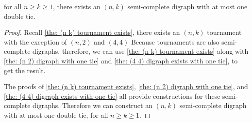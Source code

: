   \begin{theorem}
    for all \(n \geq k \geq 1\),
    there exists an \((n, k)\) semi-complete digraph with
    at most one double tie.
  \end{theorem}

  \begin{proof}
    Recall \cref{the: (n k) tournament exists},
    there exists an \((n, k)\) tournament
    with the exception of \((n, 2)\) and \((4, 4)\)
    Because tournaments are also semi-complete digraphs,
    therefore, we can use \cref{the: (n k) tournament exists}
    along with \cref{the: (n 2) digraph with one tie}
    and \cref{the: (4 4) digraph exists with one tie},
    to get the result.

    The proofs of \cref{the: (n k) tournament exists},
    \cref{the: (n 2) digraph with one tie},
    and \cref{the: (4 4) digraph exists with one tie}
    all provide constructions for these semi-complete digraphs.
    Therefore we can construct an \((n, k)\)
    semi-complete digraph with at most one double tie,
    for all \(n \geq k \geq 1\).
  \end{proof}


